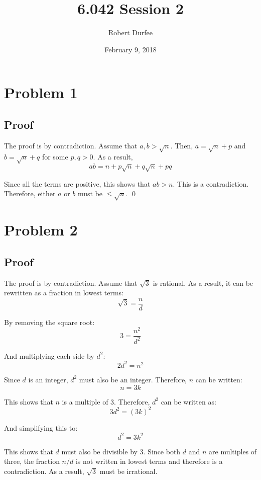 \documentclass{article}
\title{ 6.042 Session 2 }
\author{ Robert Durfee }
\date{ February 9, 2018 }
\begin{document}
\maketitle

\section*{Problem 1 }

\subsection*{Proof}

The proof is by contradiction. Assume that $a, b > \sqrt{n}$. Then, $a =
\sqrt{n} + p$ and $b = \sqrt{n} + q$ for some $p, q > 0$. As a result,
$$ ab = n + p \sqrt{n} + q \sqrt{n} + pq $$

Since all the terms are positive, this shows that $ab > n$. This is a
contradiction. Therefore, either $a$ or $b$ must be $ \leq \sqrt{n}$. \qed

\section*{Problem 2}

\subsection*{Proof}

The proof is by contradiction. Assume that $\sqrt{3}$ is rational. As a result,
it can be rewritten as a fraction in lowest terms:
$$ \sqrt{3} = \frac{ n }{ d } $$

By removing the square root:
$$ 3 = \frac{ n^{2} }{ d^{2} } $$

And multiplying each side by $d^{2}$:
$$ 2 d^{2} = n^{2} $$

Since $d$ is an integer, $d^{2}$ must also be an integer. Therefore, $n$ can be
written:
$$ n = 3k $$

This shows that $n$ is a multiple of 3. Therefore, $d^{2}$ can be written as:
$$ 3 d^{2} = \left( 3 k \right)^{2} $$

And simplifying this to:
$$ d^{2} = 3 k^{2} $$

This shows that $d$ must also be divisible by 3. Since both $d$ and $n$ are
multiples of three, the fraction $n/d$ is not written in lowest terms and
therefore is a contradiction. As a result, $\sqrt{3}$ must be irrational.

\bigbreak
\end{document}

